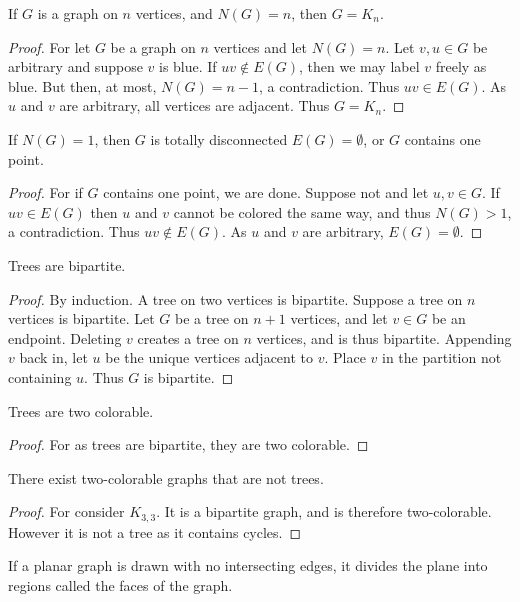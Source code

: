     \begin{theorem}
    If $G$ is a graph on $n$ vertices, and $N(G) = n$, then $G= K_n$.
    \end{theorem}
    \begin{proof}
    For let $G$ be a graph on $n$ vertices and let $N(G) = n$. Let $v,u\in G$ be arbitrary and suppose $v$ is blue. If $uv\notin E(G)$, then we may label $v$ freely as blue. But then, at most, $N(G)=n-1$, a contradiction. Thus $uv\in E(G)$. As $u$ and $v$ are arbitrary, all vertices are adjacent. Thus $G=K_n$.
    \end{proof}
    \begin{theorem}
    If $N(G) = 1$, then $G$ is totally disconnected $E(G)=\emptyset$, or $G$ contains one point.
    \end{theorem}
    \begin{proof}
    For if $G$ contains one point, we are done. Suppose not and let $u,v\in G$. If $uv \in E(G)$ then $u$ and $v$ cannot be colored the same way, and thus $N(G)>1$, a contradiction. Thus $uv\notin E(G)$. As $u$ and $v$ are arbitrary, $E(G) = \emptyset$.
    \end{proof}
    \begin{theorem}
    Trees are bipartite.
    \end{theorem}
    \begin{proof}
    By induction. A tree on two vertices is bipartite. Suppose a tree on $n$ vertices is bipartite. Let $G$ be a tree on $n+1$ vertices, and let $v\in G$ be an endpoint. Deleting $v$ creates a tree on $n$ vertices, and is thus bipartite. Appending $v$ back in, let $u$ be the unique vertices adjacent to $v$. Place $v$ in the partition not containing $u$. Thus $G$ is bipartite.
    \end{proof}
    \begin{theorem}
    Trees are two colorable.
    \end{theorem}
    \begin{proof}
    For as trees are bipartite, they are two colorable.
    \end{proof}
    \begin{theorem}
    There exist two-colorable graphs that are not trees.
    \end{theorem}
    \begin{proof}
    For consider $K_{3,3}$. It is a bipartite graph, and is therefore two-colorable. However it is not a tree as it contains cycles.
    \end{proof}
    \begin{definition}
    If a planar graph is drawn with no intersecting edges, it divides the plane into regions called the faces of the graph.
    \end{definition}
